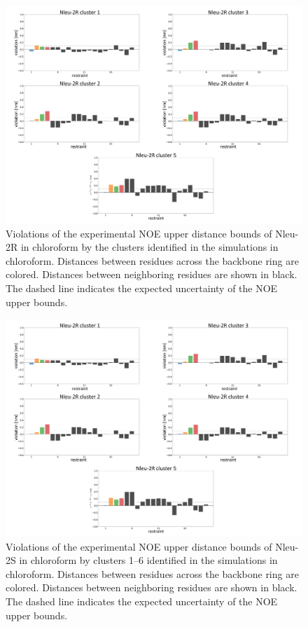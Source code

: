 \begin{figure}[h!]
    \centering
    \includegraphics[width=\textwidth]{7_chapter_5/fig/results/NMR_2R.png}
    \caption{Violations  of  the  experimental  NOE  upper  distance  bounds  of  Nleu-2R  in chloroform by the clusters identified in the simulations in chloroform. Distances between residues across the backbone ring are colored. Distances between neighboring residues are shown in black. The dashed line indicates the expected uncertainty of the NOE upper bounds.}
    \label{fig: SINOE violations Nleu-2R}
\end{figure}

\begin{figure}[h!]
    \centering
    \includegraphics[width=\textwidth]{7_chapter_5/fig/results/NMR_2R.png}
    \caption{Violations  of  the  experimental  NOE  upper  distance  bounds  of  Nleu-2S  in chloroform by clusters 1–6 identified in the simulations in chloroform. Distances between residues across the backbone ring are colored. Distances between neighboring residues are shown in black. The dashed line indicates the expected uncertainty of the NOE upper bounds.}
    \label{fig: SINOE violations Nleu-2S}
\end{figure}

